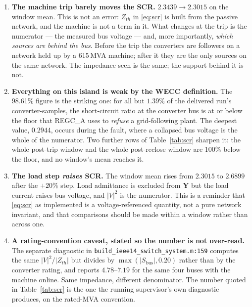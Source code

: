 \documentclass[12pt,a4paper]{article}
\theoremstyle{remark}
\newcommand{\code}[1]{\texttt{\small #1}}
\begin{document}
\begin{enumerate}[leftmargin=1.6em,itemsep=2.5pt]
\item \textbf{The machine trip barely moves the SCR.} $2.3439 \to 2.3015$ on the
      window mean. This is not an error: $Z_{th}$ in \eqref{eq:scr} is built from
      the passive network, and the machine is not a term in it. What changes at
      the trip is the numerator --- the measured bus voltage --- and, more
      importantly, \emph{which sources are behind the bus}. Before the trip the
      converters are followers on a network held up by a $615$\,MVA machine;
      after it they are the only sources on the same network. The impedance seen
      is the same; the support behind it is not.
\item \textbf{Everything on this island is weak by the WECC definition.} The
      98.61\% figure is the striking one: for all but $1.39\%$ of the delivered
      run's converter-samples, the short-circuit ratio at the converter bus is at
      or below the floor that REGC\_A uses to \emph{refuse} a grid-following
      plant. The deepest value, $0.2944$, occurs during the fault, where a
      collapsed bus voltage is the whole of the numerator. Two further rows of
      Table~\ref{tab:scr} sharpen it: the whole post-trip window and the whole
      post-reclose window are $100\%$ below the floor, and no window's mean
      reaches it.
\item \textbf{The load step \emph{raises} SCR.} The window mean rises from
      $2.3015$ to $2.6899$ after the $+20\%$ step. Load admittance is excluded
      from $\mathbf{Y}$ but the load current raises bus voltage, and $|V|^2$ is
      the numerator. This is a reminder that \eqref{eq:scr} as implemented is a
      voltage-referenced quantity, not a pure network invariant, and that
      comparisons should be made within a window rather than across one.
\item \textbf{A rating-convention caveat, stated so the number is not
      over-read.} The separate diagnostic in \code{build\_ieee14\_switch\_system.m:159}
      computes the same $|V|^2/|Z_{th}|$ but divides by
      $\max(|S_{\text{bus}}|, 0.20)$ rather than by the converter rating, and
      reports $4.78$--$7.19$ for the same four buses with the machine online.
      Same impedance, different denominator. The number quoted in
      Table~\ref{tab:scr} is the one the running supervisor's own diagnostic
      produces, on the rated-MVA convention.
\end{enumerate}
\end{document}
